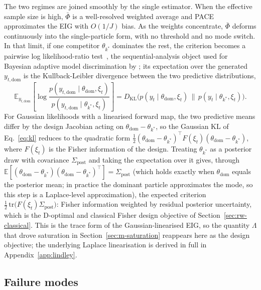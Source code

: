The two regimes are joined smoothly by the single estimator. When the effective
sample size is high, $\bar\Phi$ is a well-resolved weighted average and PACE
approximates the EIG with $O(1/J)$ bias. As the weights concentrate, $\bar\Phi$
deforms continuously into the single-particle form, with no threshold and no mode
switch. In that limit, if one competitor $\theta_{k^\ast}$ dominates the rest, the
criterion becomes a pairwise log likelihood-ratio test~\citep{wald1945sequential}, the
sequential-analysis object used for Bayesian adaptive model discrimination by
\citet{cavagnaro2010adaptive}; its expectation over the generated $y_{t,\mathrm{dom}}$ is
the Kullback-Leibler divergence between the two predictive distributions,
\begin{equation}
\label{eq:kl}
\mathbb{E}_{y_{t,\mathrm{dom}}}\!\left[\log\frac{p(y_{t,\mathrm{dom}}\mid\theta_{\mathrm{dom}},\xi_t)}{p(y_{t,\mathrm{dom}}\mid\theta_{k^\ast},\xi_t)}\right]
= D_{\mathrm{KL}}\!\big(p(y_t\mid\theta_{\mathrm{dom}},\xi_t)\,\|\,p(y_t\mid\theta_{k^\ast},\xi_t)\big).
\end{equation}
For Gaussian likelihoods with a linearised forward map, the two predictive means differ by
the design Jacobian acting on $\theta_{\mathrm{dom}}-\theta_{k^\ast}$, so the Gaussian KL of
Eq.~\eqref{eq:kl} reduces to the quadratic form
$\tfrac12(\theta_{\mathrm{dom}}-\theta_{k^\ast})^\top F(\xi_t)(\theta_{\mathrm{dom}}-\theta_{k^\ast})$,
where $F(\xi_t)$ is the Fisher information of the design. Treating $\theta_{k^\ast}$ as a
posterior draw with covariance $\Sigma_{\mathrm{post}}$ and taking the expectation over it
gives, through $\mathbb{E}[(\theta_{\mathrm{dom}}-\theta_{k^\ast})(\theta_{\mathrm{dom}}-\theta_{k^\ast})^\top]=\Sigma_{\mathrm{post}}$
(which holds exactly when $\theta_{\mathrm{dom}}$ equals the posterior mean; in practice
the dominant particle approximates the mode, so this step is a Laplace-level approximation),
the expected criterion
$\tfrac12\,\mathrm{tr}\!\big(F(\xi_t)\Sigma_{\mathrm{post}}\big)$: Fisher information weighted
by residual posterior uncertainty, which is the D-optimal and classical Fisher design
objective of Section~\ref{sec:rw-classical}. This is the trace form of the
Gaussian-linearised EIG, so the quantity $\Lambda$ that drove saturation in
Section~\ref{sec:m-saturation} reappears here as the design objective; the underlying Laplace
linearisation is derived in full in Appendix~\ref{app:lindley}.

\subsection{Failure modes}
\label{sec:m-failure}

